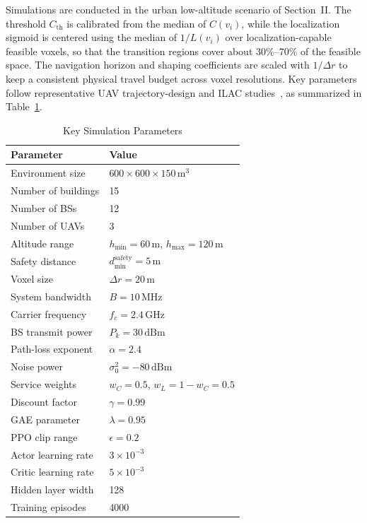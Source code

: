 \documentclass[10pt,journal,letterpaper]{IEEEtran}
\begin{document}
Simulations are conducted in the urban low-altitude scenario of Section~II. The threshold $C_{\mathrm{th}}$ is calibrated from the median of $C(v_i)$, while the localization sigmoid is centered using the median of $1/L(v_i)$ over localization-capable feasible voxels, so that the transition regions cover about $30\%$--$70\%$ of the feasible space. The navigation horizon and shaping coefficients are scaled with $1/\Delta r$ to keep a consistent physical travel budget across voxel resolutions. Key parameters follow representative UAV trajectory-design and ILAC studies~\cite{ref11,ref18}, as summarized in Table~\ref{tab:params}.

\begin{table}[!t]
\centering
\caption{Key Simulation Parameters}
\label{tab:params}
\begin{tabular}{ll}
\hline
\textbf{Parameter} & \textbf{Value} \\
\hline
Environment size & $600\times600\times150\,\mathrm{m}^3$ \\
Number of buildings & 15 \\
Number of BSs & 12 \\
Number of UAVs & 3 \\
Altitude range & $h_{\min}=60\,\mathrm{m}$, $h_{\max}=120\,\mathrm{m}$ \\
Safety distance & $d_{\min}^{\mathrm{safety}}=5\,\mathrm{m}$ \\
Voxel size & $\Delta r=20\,\mathrm{m}$ \\
System bandwidth & $B=10\,\mathrm{MHz}$ \\
Carrier frequency & $f_c=2.4\,\mathrm{GHz}$ \\
BS transmit power & $P_k=30\,\mathrm{dBm}$ \\
Path-loss exponent & $\alpha=2.4$ \\
Noise power & $\sigma_0^2=-80\,\mathrm{dBm}$ \\
Service weights & $w_C=0.5$, $w_L=1-w_C=0.5$ \\
Discount factor & $\gamma=0.99$ \\
GAE parameter & $\lambda=0.95$ \\
PPO clip range & $\epsilon=0.2$ \\
Actor learning rate & $3\times10^{-3}$ \\
Critic learning rate & $5\times10^{-3}$ \\
Hidden layer width & 128 \\
Training episodes & 4000 \\ 
\hline
\end{tabular}
\end{table}
\end{document}
